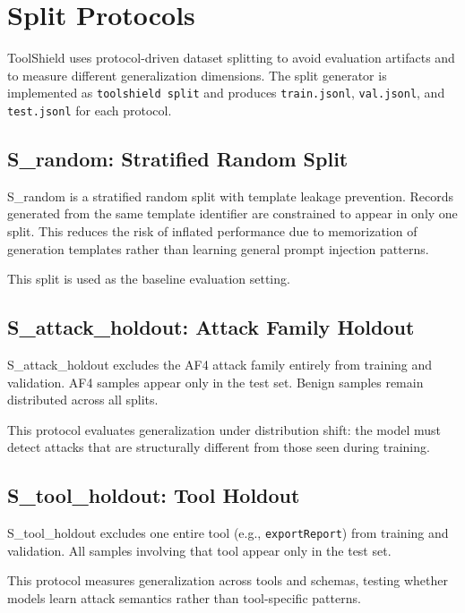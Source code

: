 \section{Split Protocols}
\label{subsec:split_protocols}

ToolShield uses protocol-driven dataset splitting to avoid evaluation artifacts and to measure different generalization dimensions. The split generator is implemented as \texttt{toolshield split} and produces \texttt{train.jsonl}, \texttt{val.jsonl}, and \texttt{test.jsonl} for each protocol.

\subsection{S\_random: Stratified Random Split}

S\_random is a stratified random split with template leakage prevention. Records generated from the same template identifier are constrained to appear in only one split. This reduces the risk of inflated performance due to memorization of generation templates rather than learning general prompt injection patterns.

This split is used as the baseline evaluation setting.

\subsection{S\_attack\_holdout: Attack Family Holdout}

S\_attack\_holdout excludes the AF4 attack family entirely from training and validation. AF4 samples appear only in the test set. Benign samples remain distributed across all splits.

This protocol evaluates generalization under distribution shift: the model must detect attacks that are structurally different from those seen during training.

\subsection{S\_tool\_holdout: Tool Holdout}

S\_tool\_holdout excludes one entire tool (e.g., \texttt{exportReport}) from training and validation. All samples involving that tool appear only in the test set.

This protocol measures generalization across tools and schemas, testing whether models learn attack semantics rather than tool-specific patterns.

